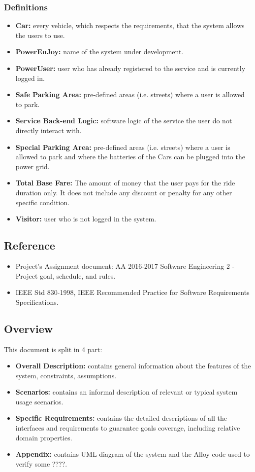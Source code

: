 \subsubsection{Definitions}
\begin{itemize}
\item \textbf{Car:} every vehicle, which respects the requirements, that the system allows the users to use.
\item \textbf{PowerEnJoy:} name of the system under development.
\item \textbf{PowerUser:} user who has already registered to the service and is currently logged in.
\item \textbf{Safe Parking Area:} pre-defined areas (i.e. streets) where a user is allowed to park.
\item \textbf{Service Back-end Logic:} software logic of the service the user do not directly interact with. 
\item \textbf{Special Parking Area:}  pre-defined areas (i.e. streets) where a user is allowed to park and where the batteries of the Cars can be plugged into the power grid.
\item \textbf{Total Base Fare:} The amount of money that the user pays for the ride duration only. It does not include any discount or penalty for any other specific condition.
\item \textbf{Visitor:} user who is not logged in the system.
\end{itemize}
\subsection{Reference}
\begin{itemize}
\item Project's Assignment document: AA 2016-2017 Software Engineering 2 - Project goal, schedule, and rules.
\item IEEE Std 830-1998, IEEE Recommended Practice for Software Requirements Specifications.
\end{itemize}
\subsection{Overview}
This document is split in 4 part:
\begin{itemize}
\item \textbf{Overall Description:} contains general information about the features of the system, constraints, assumptions. 
\item \textbf{Scenarios:} contains an informal description of relevant or typical system usage scenarios.
\item \textbf{Specific Requirements:} contains the detailed descriptions of all the interfaces and requirements to guarantee goals coverage, including relative domain properties. 
\item \textbf{Appendix:} contains UML diagram of the system and the Alloy code used to verify some ????.
\end{itemize}